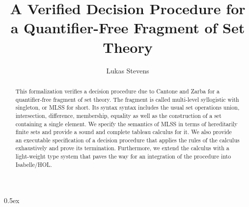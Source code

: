 \documentclass[11pt,a4paper]{article}
\begin{document}
\title{A Verified Decision Procedure for a Quantifier-Free Fragment of Set Theory}
\author{Lukas Stevens}
\maketitle

\begin{abstract}
  This formalization verifies a decision procedure due to Cantone and Zarba for a quantifier-free fragment of set theory.
  The fragment is called multi-level syllogistic with singleton, or MLSS for short.
  Its syntax syntax includes the usual set operations union, intersection, difference, membership, equality as well as the construction of a set containing a single element.
  We specify the semantics of MLSS in terms of hereditarily finite sets and provide a sound and complete tableau calculus for it. 
  We also provide an executable specification of a decision procedure that applies the rules of the calculus exhaustively and prove its termination.
  Furthermore, we extend the calculus with a light-weight type system that paves the way for an integration of the procedure into Isabelle/HOL.
\end{abstract}

\newpage

\parindent 0pt\parskip 0.5ex



\nocite{*}


\end{document}
